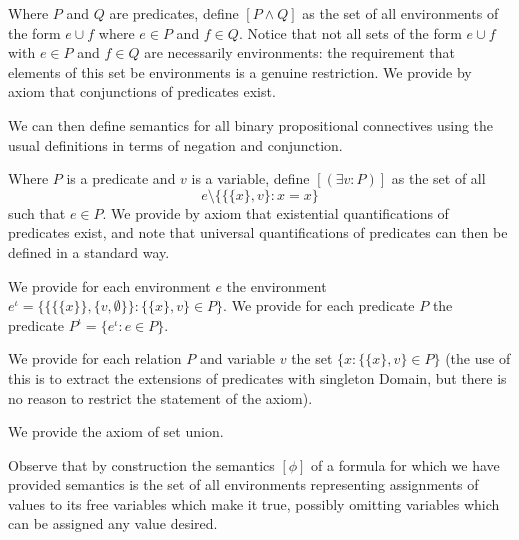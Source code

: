 \documentclass{slides}
\begin{document}
\begin{slide}
Where $P$ and $Q$ are predicates, define $[P \wedge Q]$ as the set of all environments of the form $e \cup f$ where $e \in P$ and $f \in Q$.  Notice that not all sets of the form $e \cup f$ with $e \in P$ and $f \in Q$ are necessarily environments:  the requirement that
elements of this set be environments is a genuine restriction.  We provide by axiom that conjunctions of predicates exist.

We can then define semantics for all binary propositional connectives using the usual definitions in terms of negation and conjunction.

Where $P$ is a predicate and $v$ is a variable, define $[(\exists v:P)]$ as the set of all $$e \setminus \{\{\{x\},v\}:x=x\}$$ such that $e \in P$.  We provide by axiom that existential quantifications of predicates exist,
and note that universal quantifications of predicates can then be defined in a standard way.

We provide for each environment $e$ the environment $e^\iota = \{\{\{\{x\}\},\{v,\emptyset\}\}:\{\{x\},v\}\in P\}$.  We provide for
each predicate $P$ the predicate $P^\iota = \{e^\iota:e \in P\}$.

We provide for each relation $P$ and variable $v$ the set $\{x:\{\{x\},v\}\in P\}$  (the use of this is to extract the extensions of predicates with singleton Domain, but there is no reason to restrict the statement of the axiom).

We provide the axiom of set union.

Observe that by construction the semantics $[\phi]$ of a formula for which we have provided semantics is the set of all environments representing assignments of values to its free variables which make it true, possibly omitting variables which can be assigned any value desired.


\end{slide}
\end{document}
